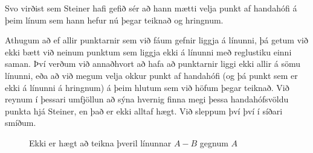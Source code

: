 \begin{frame}
  Svo virðist sem Steiner hafi gefið sér að hann mætti velja punkt af handahófi
  á þeim línum sem hann hefur nú þegar teiknað og hringnum.
  
  Athugum að ef allir punktarnir sem við fáum gefnir liggja á línunni,
  þá getum við ekki bætt við neinum punktum sem liggja ekki á línunni með
  reglustiku einni saman. Því verðum við annaðhvort að hafa að punktarnir liggi
  ekki allir á sömu línunni, eða að við megum velja okkur punkt af handahófi
  (og þá punkt sem er ekki á línunni á hringnum) á þeim hlutum sem við höfum þegar teiknað.
  Við reynum í þessari umfjöllun að sýna hvernig finna megi þessa handahófsvöldu
  punkta hjá Steiner, en það er ekki alltaf hægt. Við sleppum því því í síðari smíðum.

  \begin{figure}[H]
    \centering
    
    \caption{Ekki er hægt að teikna þveril línunnar \(A-B\) gegnum \(A\)}
    \label{fig:ekkiallir}
  \end{figure}
\end{frame}

